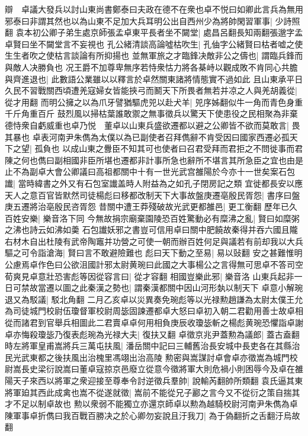 辯　卓議大發兵以討山東尚書鄭泰曰夫政在德不在衆也卓不悦曰如卿此言兵為無用邪泰曰非謂其然也以為山東不足加大兵耳明公出自西州少為將帥閑習軍事|{
	少詩照翻}
袁本初公卿子弟生處京師張孟卓東平長者坐不闚堂|{
	處昌呂翻長知兩翻張邈字孟卓賢曰坐不闚堂言不妄視也}
孔公緒清談高論噓枯吹生|{
	孔伷字公緒賢曰枯者嘘之使生生者吹之使枯言談論有所抑揚也}
並無軍旅之才臨鋒决敵非公之儔也|{
	謂臨兵鋒而與敵人决勝負也}
况王爵不加尊卑無序若恃衆怙力將各棊峙以觀成敗不肯同心共膽與齊進退也|{
	此數語公業雖以以釋言於卓然關東諸將情態實不過如此}
且山東承平日久民不習戰關西頃遭羌寇婦女皆能挾弓而鬭天下所畏者無若并凉之人與羌胡義從|{
	從才用翻}
而明公擁之以為爪牙譬猶驅虎兕以赴犬羊|{
	兕序姊翻似牛一角而青色身重千斤角重百斤}
鼓烈風以掃枯葉誰敢禦之無事徵兵以驚天下使患役之民相聚為非棄德恃衆自虧威重也卓乃悦　董卓以山東兵盛欲遷都以避之公卿皆不欲而莫敢言|{
	畏其暴也}
卓表河南尹朱儁為太僕以為已副使者召拜儁辭不肯受因曰國家西遷必孤天下之望|{
	孤負也}
以成山東之釁臣不知其可也使者曰召君受拜而君拒之不問徙事而君陳之何也儁曰副相國非臣所堪也遷都非計事所急也辭所不堪言其所急臣之宜也由是止不為副卓大會公卿議曰高祖都關中十有一世光武宫雒陽於今亦十一世矣案石包䜟|{
	當時緯書之外又有石包室䜟盖時人附益為之如孔子閉房記之類}
宜徙都長安以應天人之意百官皆默然司徒楊彪曰移都改制天下大事故盤庚遷亳殷民胥怨|{
	書序曰盤庚五遷將治亳殷民咨胥怨}
昔關中遭王莽殘破故光武更都雒邑|{
	更工衡翻}
歷年已久百姓安樂|{
	樂音洛下同}
今無故捐宗廟棄園陵恐百姓驚動必有糜沸之亂|{
	賢曰如糜粥之沸也詩云如沸如羮}
石包䜟妖邪之書豈可信用卓曰關中肥饒故秦得并吞六國且隴右材木自出杜陵有武帝陶竈并功營之可使一朝而辦百姓何足與議若有前却我以大兵驅之可令詣滄海|{
	賢曰言不敢避險難也}
彪曰天下動之至易|{
	易以䜴翻}
安之甚難惟明公慮焉卓作色曰公欲沮國計邪太尉黄琬曰此國之大事楊公之言得無可思卓不答司空荀爽見卓意壯恐害彪等因從容言曰|{
	從才容翻}
相國豈樂此邪|{
	樂音洛}
山東兵起非一日可禁故當遷以圖之此秦漢之勢也|{
	謂秦漢都關中因山河形埶以制天下}
卓意小解琬退又為駁議|{
	駁北角翻}
二月乙亥卓以災異奏免琬彪等以光禄勲趙謙為太尉太僕王允為司徒城門校尉伍瓊督軍校尉周毖固諫遷都卓大怒曰卓初入朝二君勸用善士故卓相從而諸君到官舉兵相圖此二君賣卓卓何用相負庚辰收瓊毖斬之楊彪黄琬恐懼詣卓謝卓亦悔殺瓊毖乃復表彪琬為光禄大夫|{
	復扶又翻}
卓徵京兆尹蓋勲為議郎|{
	蓋古盍翻}
時左將軍皇甫嵩將兵三萬屯扶風|{
	潘岳關中記曰三輔舊治長安城中長吏各在其縣治民光武東都之後扶風出治槐里馮翊出治高陵}
勲密與嵩謀討卓會卓亦徵嵩為城門校尉嵩長史梁衍說嵩曰董卓寇掠京邑廢立從意今徵將軍大則危禍小則困辱今及卓在雒陽天子來西以將軍之衆迎接至尊奉令討逆徵兵羣帥|{
	說輸芮翻帥所類翻}
袁氏逼其東將軍廹其西此成禽也嵩不從遂就徵|{
	嵩前不能從兄子酈之言今又不從衍之策自揣其才不足以制卓故也}
勲以衆弱不能獨立亦還京師卓以勲為越騎校尉河南尹朱儁為卓陳軍事卓折儁曰我百戰百勝决之於心卿勿妄說且汙我刀|{
	為于偽翻折之舌翻汙烏故翻}
